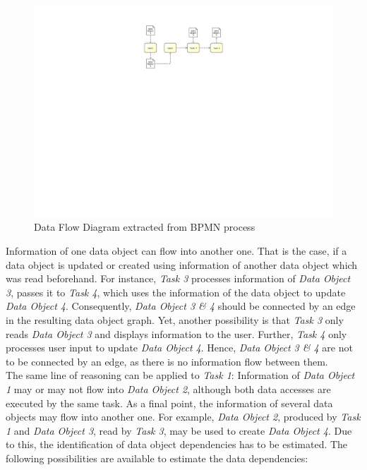 \begin{figure}[h!]
	\centering
	\includegraphics[width=12cm, trim={10cm 14.5cm 10cm 3cm}]{img/DataFlowExample.pdf}
	\caption{Data Flow Diagram extracted from BPMN process}
	\label{fig:dataFlowExample}
\end{figure}

\noindent
Information of one data object can flow into another one. That is the case, if a data object is updated or created using information of another data object which was read beforehand. 
For instance, \textit{Task 3} processes information of \textit{Data Object 3}, passes it to \textit{Task 4}, which uses the information of the data object to update \textit{Data Object 4}. Consequently, \textit{Data Object 3 \& 4} should be connected by an edge in the resulting data object graph. Yet, another possibility is that \textit{Task 3} only reads \textit{Data Object 3} and displays information to the user. Further, \textit{Task 4} only processes user input to update \textit{Data Object 4}. Hence, \textit{Data Object 3 \& 4} are not to be connected by an edge, as there is no information flow between them. \\
The same line of reasoning can be applied to \textit{Task 1}: Information of \textit{Data Object 1} may or may not flow into \textit{Data Object 2}, although both data accesses are executed by the same task. As a final point, the information of several data objects may flow into another one. For example, \textit{Data Object 2}, produced by \textit{Task 1} and \textit{Data Object 3}, read by \textit{Task 3}, may be used to create \textit{Data Object 4}. Due to this, the identification of data object dependencies has to be estimated. The following possibilities are available to estimate the data dependencies:


